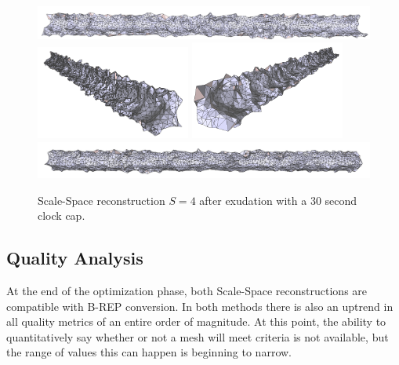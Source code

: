 \documentclass[12pt]{drexelthesis}
\let\Oldsubsection\subsection
\renewcommand{\subsection}{\FloatBarrier\Oldsubsection}
\begin{document}
\begin{figure}[!ht]
	\centering
		\includegraphics[width=5in]{simulated-lab-scan/2cmnoise/optimizedNeat/scalespace4everything00.png}
		\includegraphics[width=2in]{simulated-lab-scan/2cmnoise/optimizedNeat/scalespace4everything01.png}
		\includegraphics[width=2in]{simulated-lab-scan/2cmnoise/optimizedNeat/scalespace4everything02.png}
		\includegraphics[width=5in]{simulated-lab-scan/2cmnoise/optimizedNeat/scalespace4everything03.png}
		\caption[Scale-Space reconstruction $S = 4$ after exudation with a 30 second clock cap]{\centering Scale-Space reconstruction $S = 4$ after exudation with a 30 second clock cap.}
	\label{2cmnoise:scalespace4everything}
\end{figure}

\subsection{Quality Analysis}

At the end of the optimization phase, both Scale-Space reconstructions are compatible with B-REP conversion. In both methods there is also an uptrend in all quality metrics of an entire order of magnitude. At this point, the ability to quantitatively say whether or not a mesh will meet criteria is not available, but the range of values this can happen is beginning to narrow.
\end{document}
